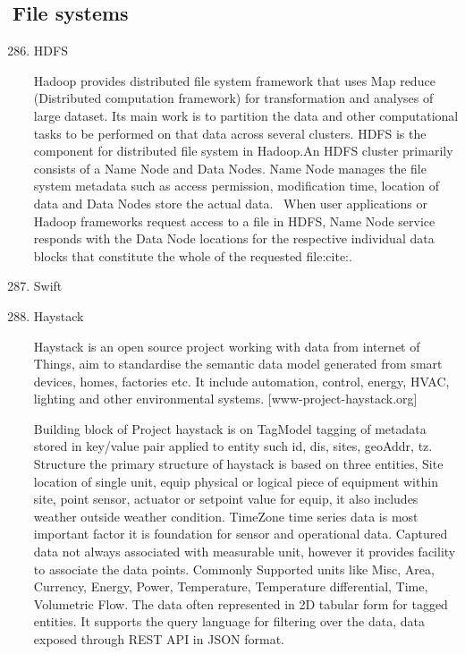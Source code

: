 \subsection{File systems}
\label{\detokenize{i524/technologies:file-systems}}\begin{enumerate}
\setcounter{enumi}{285}
\item {} 
HDFS

Hadoop provides distributed file system framework that uses Map
reduce (Distributed computation framework) for transformation and
analyses of large dataset.  Its main work is to partition the
data and other computational tasks to be performed on that data
across several clusters.  HDFS is the component for distributed
file system in Hadoop.An HDFS cluster primarily consists of a
Name Node and Data Nodes. Name Node manages the file system
metadata such as access permission, modification time, location
of data and Data Nodes store the actual data.   When user
applications or Hadoop frameworks request access to a file in
HDFS, Name Node service responds with the Data Node locations for
the respective individual data blocks that constitute the whole
of the requested file:cite:.

\item {} 
Swift

\item {} 
Haystack

Haystack is an open source project working with data from
internet of Things, aim to standardise the semantic data model
generated from smart devices, homes, factories etc.  It include
automation, control, energy, HVAC, lighting and other
environmental systems.  {[}www-project-haystack.org{]}

Building block of Project haystack is on TagModel tagging of
metadata stored in key/value pair applied to entity such id, dis,
sites, geoAddr, tz. Structure the primary structure of haystack
is based on three entities, Site location of single unit, equip
physical or logical piece of equipment within site, point sensor,
actuator or setpoint value for equip, it also includes weather
outside weather condition. TimeZone time series data is most
important factor it is foundation for sensor and operational
data. Captured data not always associated with measurable unit,
however it provides facility to associate the data points.
Commonly Supported units like Misc, Area, Currency, Energy,
Power, Temperature, Temperature differential, Time, Volumetric
Flow. The data often represented in 2D tabular form for tagged
entities. It supports the query language for filtering over the
data, data exposed through REST API in JSON format.


\end{enumerate}
